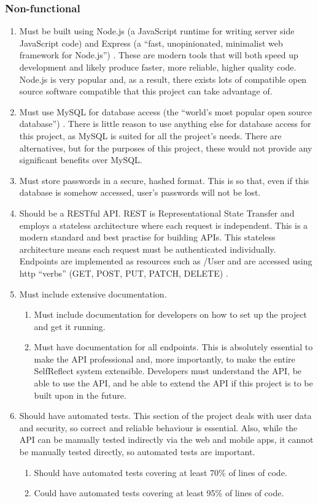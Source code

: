 \documentclass[11pt,openright,a4paper]{report}
\begin{document}
\subsubsection{Non-functional}
\begin{enumerate}
\item Must be built using Node.js (a JavaScript runtime for writing server side JavaScript code) \parencite{nodejs} and Express (a \enquote{fast, unopinionated, minimalist web framework for Node.js}) \parencite{expressjs}. These are modern tools that will both speed up development and likely produce faster, more reliable, higher quality code. Node.js is very popular and, as a result, there exists lots of compatible open source software compatible that this project can take advantage of.
\item Must use MySQL for database access (the \enquote{world's most popular open source database}) \parencite{mysql}. There is little reason to use anything else for database access for this project, as MySQL is suited for all the project's needs. There are alternatives, but for the purposes of this project, these would not provide any significant benefits over MySQL.
\item Must store passwords in a secure, hashed format. This is so that, even if this database is somehow accessed, user's passwords will not be lost.
\item Should be a RESTful API. REST is Representational State Transfer and employs a stateless architecture where each request is independent. This is a modern standard and best practise for building APIs. This stateless architecture means each request must be authenticated individually. Endpoints are implemented as resources such as /User and are accessed using http \enquote{verbs} (GET, POST, PUT, PATCH, DELETE) \parencite{httpmethods}.
\item Must include extensive documentation.
  \begin{enumerate}
  \item Must include documentation for developers on how to set up the project and get it running.
  \item Must have documentation for all endpoints. This is absolutely essential to make the API professional and, more importantly, to make the entire SelfReflect system extensible. Developers must understand the API, be able to use the API, and be able to extend the API if this project is to be built upon in the future.
  \end{enumerate}
\item Should have automated tests. This section of the project deals with user data and security, so correct and reliable behaviour is essential. Also, while the API can be manually tested indirectly via the web and mobile apps, it cannot be manually tested directly, so automated tests are important.
  \begin{enumerate}
  \item Should have automated tests covering at least 70\% of lines of code.
  \item Could have automated tests covering at least 95\% of lines of code.
  \end{enumerate}
\end{enumerate}
\end{document}
